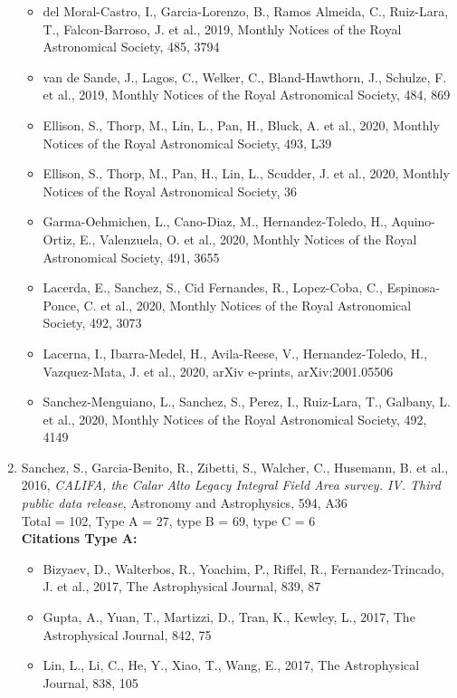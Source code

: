 \documentclass{letter}
\begin{document}
\begin{enumerate}
\begin{itemize}
\item del Moral-Castro, I., Garcia-Lorenzo, B., Ramos Almeida, C., Ruiz-Lara, T., Falcon-Barroso, J. et al., 2019, Monthly Notices of the Royal Astronomical Society, 485, 3794
\item van de Sande, J., Lagos, C., Welker, C., Bland-Hawthorn, J., Schulze, F. et al., 2019, Monthly Notices of the Royal Astronomical Society, 484, 869
\item Ellison, S., Thorp, M., Lin, L., Pan, H., Bluck, A. et al., 2020, Monthly Notices of the Royal Astronomical Society, 493, L39
\item Ellison, S., Thorp, M., Pan, H., Lin, L., Scudder, J. et al., 2020, Monthly Notices of the Royal Astronomical Society, 36
\item Garma-Oehmichen, L., Cano-Diaz, M., Hernandez-Toledo, H., Aquino-Ortiz, E., Valenzuela, O. et al., 2020, Monthly Notices of the Royal Astronomical Society, 491, 3655
\item Lacerda, E., Sanchez, S., Cid Fernandes, R., Lopez-Coba, C., Espinosa-Ponce, C. et al., 2020, Monthly Notices of the Royal Astronomical Society, 492, 3073
\item Lacerna, I., Ibarra-Medel, H., Avila-Reese, V., Hernandez-Toledo, H., Vazquez-Mata, J. et al., 2020, arXiv e-prints, arXiv:2001.05506
\item Sanchez-Menguiano, L., Sanchez, S., Perez, I., Ruiz-Lara, T., Galbany, L. et al., 2020, Monthly Notices of the Royal Astronomical Society, 492, 4149
\end{itemize}
\item Sanchez, S., Garcia-Benito, R., Zibetti, S., Walcher, C., Husemann, B. et al., 2016, {\it CALIFA, the Calar Alto Legacy Integral Field Area survey. IV. Third public data release}, Astronomy and Astrophysics, 594, A36 \\ 
Total = 102, Type A = 27, type B = 69, type C = 6 \\ 
{\bf Citations Type A:}
\begin{itemize}
\item Bizyaev, D., Walterbos, R., Yoachim, P., Riffel, R., Fernandez-Trincado, J. et al., 2017, The Astrophysical Journal, 839, 87
\item Gupta, A., Yuan, T., Martizzi, D., Tran, K., Kewley, L., 2017, The Astrophysical Journal, 842, 75
\item Lin, L., Li, C., He, Y., Xiao, T., Wang, E., 2017, The Astrophysical Journal, 838, 105

\end{itemize}
\end{enumerate}
\end{document}
